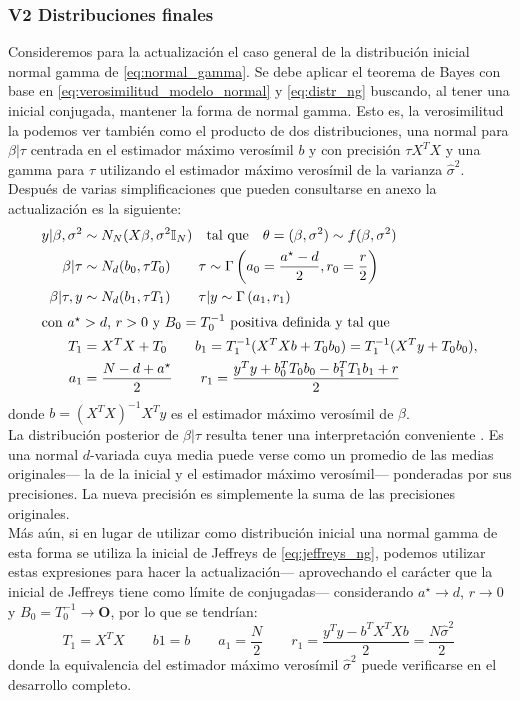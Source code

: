 \subsubsection*{V2 Distribuciones finales}

Consideremos para la actualización el caso general de la distribución inicial normal gamma de \eqref{eq:normal_gamma}. Se debe aplicar el teorema de Bayes con base en \eqref{eq:verosimilitud_modelo_normal} y \eqref{eq:distr_ng} buscando, al tener una inicial conjugada, mantener la forma de normal gamma. Esto es, la verosimilitud la podemos ver también como el producto de dos distribuciones, una normal para $\beta|\tau$ centrada en el estimador máximo verosímil $b$ y con precisión $\tau X^TX$ y una gamma para $\tau$ utilizando el estimador máximo verosímil de la varianza $\hat{\sigma}^2$. Después de varias simplificaciones {\color{Aquamarine} que pueden consultarse en anexo} la actualización es la siguiente:
\begin{align} \label{eq:modelo_normal_post_bayes}
y|\beta, \sigma^2 &\sim N_N(X\beta,\sigma^2\mathbb{I}_N) \quad \text{tal que} \quad \theta = (\beta, \sigma^2) \sim f(\beta,\sigma^2) \nonumber \\
\beta|\tau &\sim N_d(b_0,\tau T_0) \qquad \tau \sim \Gamma\left(a_0 = \dfrac{a^\star-d}{2},r_0 = \dfrac{r}{2}\right) \nonumber \\ 
\beta|\tau , y &\sim N_d(b_1,\tau T_1) \qquad \tau|y \sim \Gamma\left(a_1,r_1\right) \nonumber \\
\intertext{con $a^\star > d $, $r > 0$ y $B_0 = T_0^{-1}$ positiva definida y tal que} \nonumber
T_1 &= X^TX+T_0 \qquad b_1 = T_1^{-1}(X^TXb+T_0b_0) = T_1^{-1}(X^Ty+T_0b_0),\nonumber \\ 
a_1 &= \dfrac{N-d+a^\star}{2} \qquad r_1 = \dfrac{y^Ty + b_0^TT_0b_0 - b_1^TT_1b_1 + r}{2}
\end{align}
donde $b=(X^TX)^{-1}X^Ty$ es el estimador máximo verosímil de $\beta$.\\

La distribución posterior de $\beta|\tau$ resulta tener una interpretación conveniente \parencite{Congdon06}. Es una normal $d$-variada cuya media puede verse como un promedio de las medias originales--- la de la inicial y el estimador máximo verosímil--- ponderadas por sus precisiones. La nueva precisión es simplemente la suma de las precisiones originales.\\

Más aún, si en lugar de utilizar como distribución inicial una normal gamma de esta forma se utiliza la inicial de Jeffreys de \eqref{eq:jeffreys_ng}, podemos utilizar estas expresiones para hacer la actualización--- aprovechando el carácter que la inicial de Jeffreys tiene como límite de conjugadas--- considerando $a^\star \rightarrow d $, $r \rightarrow 0$ y $B_0 = T_0^{-1} \rightarrow \mathbf{O}$, por lo que se tendrían: 
\begin{equation*}
T_1 = X^TX \qquad b1 = b \qquad a_1 = \dfrac{N}{2} \qquad r_1 = \dfrac{y^Ty - b^TX^TXb}{2}=\dfrac{N\hat{\sigma}^2}{2} \,
\end{equation*}
{\color{Aquamarine} donde la equivalencia del estimador máximo verosímil $\hat{\sigma}^2$ puede verificarse en el desarrollo completo}.\\

